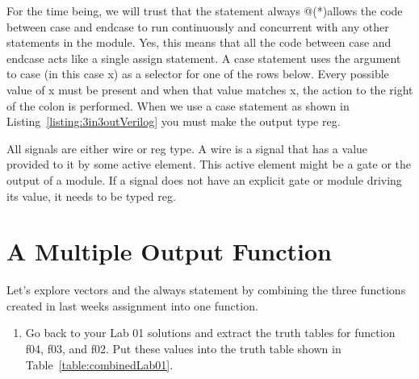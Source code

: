 For the time being, we will trust that the statement always @(*)allows
the code between case and endcase to run continuously and concurrent
with any other statements in the module. Yes, this means that all the
code between case and endcase acts like a single assign statement. A
case statement uses the argument to case (in this case x) as a selector
for one of the rows below. Every possible value of x must be present and
when that value matches x, the action to the right of the colon is
performed. When we use a case statement as shown in Listing~\ref{listing:3in3outVerilog} 
you must make the output type reg.

All signals are either wire or reg type. A wire is a signal that has a
value provided to it by some active element. This active element might
be a gate or the output of a module. If a signal does not have an
explicit gate or module driving its value, it needs to be typed reg.

\hypertarget{part-1-combine-lab-1-functions.}{%
\section{A Multiple Output Function}\label{part-1-combine-lab-1-functions.}}

Let's explore vectors and the always statement by combining the three
functions created in last weeks assignment into one function.

\begin{enumerate}
\def\labelenumi{\arabic{enumi}.}
\item
  Go back to your Lab 01 solutions and extract the truth tables for
  function f04, f03, and f02. Put these values into the truth table
  shown in Table~\ref{table:combinedLab01}.
\end{enumerate}

